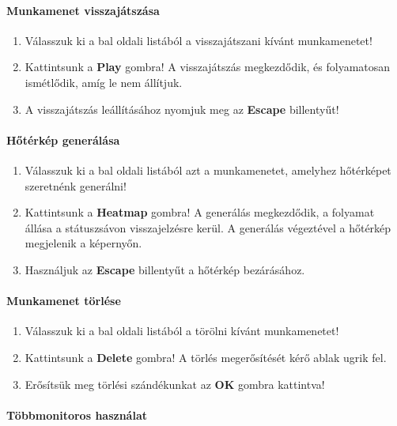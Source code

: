 \paragraph{Munkamenet visszajátszása}

\begin{enumerate}
  \item Válasszuk ki a bal oldali listából a visszajátszani kívánt munkamenetet!
  \item Kattintsunk a \textbf{Play} gombra! A visszajátszás megkezdődik, és folyamatosan ismétlődik, amíg le nem állítjuk.
  \item A visszajátszás leállításához nyomjuk meg az \textbf{Escape} billentyűt!
\end{enumerate}

\paragraph{Hőtérkép generálása}

\begin{enumerate}
  \item Válasszuk ki a bal oldali listából azt a munkamenetet, amelyhez hőtérképet szeretnénk generálni!
  \item Kattintsunk a \textbf{Heatmap} gombra! A generálás megkezdődik, a folyamat állása a státuszsávon visszajelzésre kerül. A generálás végeztével a hőtérkép megjelenik a képernyőn.
  \item Használjuk az \textbf{Escape} billentyűt a hőtérkép bezárásához.
\end{enumerate}

\paragraph{Munkamenet törlése}

\begin{enumerate}
  \item Válasszuk ki a bal oldali listából a törölni kívánt munkamenetet!
  \item Kattintsunk a \textbf{Delete} gombra! A törlés megerősítését kérő ablak ugrik fel.
  \item Erősítsük meg törlési szándékunkat az \textbf{OK} gombra kattintva!
\end{enumerate}

\paragraph{Többmonitoros használat}

